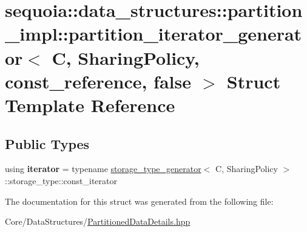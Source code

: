 \hypertarget{structsequoia_1_1data__structures_1_1partition__impl_1_1partition__iterator__generator_3_01_c_000ef97c0f957f496bc97920f695c40b36}{}\section{sequoia\+::data\+\_\+structures\+::partition\+\_\+impl\+::partition\+\_\+iterator\+\_\+generator$<$ C, Sharing\+Policy, const\+\_\+reference, false $>$ Struct Template Reference}
\label{structsequoia_1_1data__structures_1_1partition__impl_1_1partition__iterator__generator_3_01_c_000ef97c0f957f496bc97920f695c40b36}
\subsection*{Public Types}
\begin{DoxyCompactItemize}
\item 
\mbox{\label{structsequoia_1_1data__structures_1_1partition__impl_1_1partition__iterator__generator_3_01_c_000ef97c0f957f496bc97920f695c40b36_aed2011e6b92d263a6db49d7ee64f6d39}} 
using {\bfseries iterator} = typename \mbox{\hyperlink{structsequoia_1_1data__structures_1_1partition__impl_1_1storage__type__generator}{storage\+\_\+type\+\_\+generator}}$<$ C, Sharing\+Policy $>$\+::storage\+\_\+type\+::const\+\_\+iterator
\end{DoxyCompactItemize}


The documentation for this struct was generated from the following file\+:\begin{DoxyCompactItemize}
\item 
Core/\+Data\+Structures/\mbox{\hyperlink{_partitioned_data_details_8hpp}{Partitioned\+Data\+Details.\+hpp}}\end{DoxyCompactItemize}
